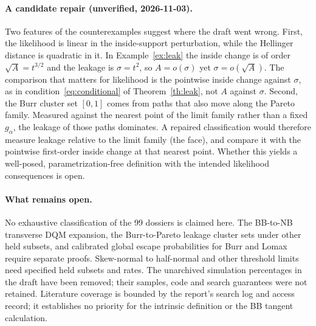\documentclass[11pt]{article}
\theoremstyle{definition}
\theoremstyle{remark}
\begin{document}
\paragraph{A candidate repair (unverified, 2026-11-03).}
Two features of the counterexamples suggest where the draft went wrong.
First, the likelihood is linear in the inside-support perturbation, while
the Hellinger distance is quadratic in it. In Example~\ref{ex:leak} the
inside change is of order $\sqrt A=t^{3/2}$ and the leakage is
$\sigma=t^2$, so $A=o(\sigma)$ yet $\sigma=o(\sqrt A)$. The comparison
that matters for likelihood is the pointwise inside change against
$\sigma$, as in condition~\eqref{eq:conditional} of
Theorem~\ref{th:leak}, not $A$ against $\sigma$. Second, the Burr
cluster set $[0,1]$ comes from paths that also move along the Pareto
family. Measured against the nearest point of the limit family rather
than a fixed $g_\alpha$, the leakage of those paths dominates. A repaired
classification would therefore measure leakage relative to the limit
family (the face), and compare it with the pointwise first-order inside
change at that nearest point. Whether this yields a well-posed,
parametrization-free definition with the intended likelihood
consequences is open.

\paragraph{What remains open.}
No exhaustive classification of the 99 dossiers is claimed here. The
BB-to-NB transverse DQM expansion, the Burr-to-Pareto leakage cluster
sets under other held subsets, and calibrated global escape
probabilities for Burr and Lomax require separate proofs. Skew-normal to
half-normal and other threshold limits need specified held subsets and rates.
The unarchived simulation percentages in the draft have been removed; their
samples, code and search guarantees were not retained. Literature coverage is
bounded by the report's search log and access record; it establishes no
priority for the intrinsic definition or the BB tangent calculation.
\end{document}
